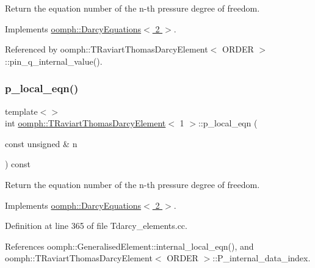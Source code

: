 Return the equation number of the n-\/th pressure degree of freedom. 



Implements \hyperlink{classoomph_1_1DarcyEquations_a3eee8ba9fd2256d01c4be1141a5d6eb1}{oomph\+::\+Darcy\+Equations$<$ 2 $>$}.



Referenced by oomph\+::\+T\+Raviart\+Thomas\+Darcy\+Element$<$ O\+R\+D\+E\+R $>$\+::pin\+\_\+q\+\_\+internal\+\_\+value().

\mbox{\label{classoomph_1_1TRaviartThomasDarcyElement_a61ab9a21f152902ddd1869cd2c358602}} 
\subsubsection{\texorpdfstring{p\+\_\+local\+\_\+eqn()}{p\_local\_eqn()}\hspace{0.1cm}{\footnotesize\ttfamily [3/3]}}
{\footnotesize\ttfamily template$<$$>$ \\
int \hyperlink{classoomph_1_1TRaviartThomasDarcyElement}{oomph\+::\+T\+Raviart\+Thomas\+Darcy\+Element}$<$ 1 $>$\+::p\+\_\+local\+\_\+eqn (\begin{DoxyParamCaption}\item[{const unsigned \&}]{n }\end{DoxyParamCaption}) const\hspace{0.3cm}{\ttfamily [virtual]}}



Return the equation number of the n-\/th pressure degree of freedom. 



Implements \hyperlink{classoomph_1_1DarcyEquations_a3eee8ba9fd2256d01c4be1141a5d6eb1}{oomph\+::\+Darcy\+Equations$<$ 2 $>$}.



Definition at line 365 of file Tdarcy\+\_\+elements.\+cc.



References oomph\+::\+Generalised\+Element\+::internal\+\_\+local\+\_\+eqn(), and oomph\+::\+T\+Raviart\+Thomas\+Darcy\+Element$<$ O\+R\+D\+E\+R $>$\+::\+P\+\_\+internal\+\_\+data\+\_\+index.

